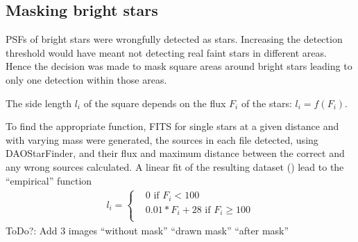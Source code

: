\documentclass[letterpaper,10pt,english]{sphinxmanual}
\begin{document}
\subsection{Masking bright stars}
\label{\detokenize{NBodySimulation/DataReduction:masking-bright-stars}}\label{\detokenize{NBodySimulation/DataReduction:masking-bright-stars-label}}
\sphinxAtStartPar
PSFs of bright stars were wrongfully detected as stars. Increasing the detection threshold would have meant not detecting real faint stars in different areas.
Hence the decision was made to mask square areas around bright stars leading to only one detection within those areas.

\sphinxAtStartPar
The side length \(l_i\) of the square depends on the flux \(F_i\) of the stars: \(l_i = f(F_i)\).

\sphinxAtStartPar
To find the appropriate function, FITS for single stars at a given distance and with varying mass were generated,
the sources in each file detected, using DAOStarFinder, and their flux and maximum distance between the correct and any wrong sources calculated.
A linear fit of the resulting dataset ({\hyperref[\detokenize{NBodySimulation/Appendix:appendix-label}]{}}) lead to the “empirical” function
\begin{equation}\label{equation:NBodySimulation/DataReduction:side_length}
\begin{split}l_i = \begin{cases}
 & 0\text{ if } F_i < 100\\
 & 0.01*F_i+28\text{ if } F_i \geqslant 100\\
\end{cases}\end{split}
\end{equation}
\sphinxAtStartPar
ToDo?: Add 3 images “without mask” “drawn mask” “after mask”
\end{document}
